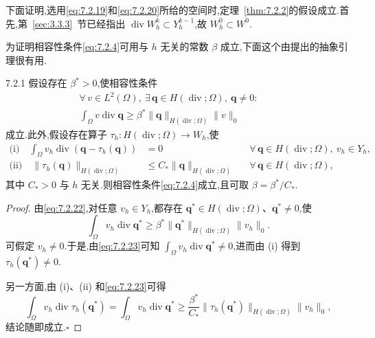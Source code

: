 下面证明,选用\eqref{eq:7.2.19}和\eqref{eq:7.2.20}所给的空间时,定理~\ref{thm:7.2.2}的假设成立.首先,第~\ref{sec:3.3.3}~节已经指出 \(\operatorname{div}W_h^k\subset Y_h^{k-1}\),故 \(W_h^0\subset W^0\).

为证明相容性条件\eqref{eq:7.2.4}可用与 \(h\) 无关的常数 \(\beta\) 成立,下面这个由提出的抽象引理很有用.

\begin{lemma}[Fortin]{7.2.1}
假设存在 \(\beta^*>0\),使相容性条件
\begin{equation}\label{eq:7.2.22}
  \begin{gathered}
    \forall\,v\in L^2(\Omega),\ \exists\,\boldsymbol{q}\in H(\operatorname{div};\Omega),\
      \boldsymbol{q}\ne0:\qquad\\
    \int_\Omega v\operatorname{div}\boldsymbol{q}
      \ge\beta^*\|\boldsymbol{q}\|_{H(\operatorname{div};\Omega)}\|v\|_0
  \end{gathered}
\end{equation}
成立.此外,假设存在算子 \(\tau_h\colon H(\operatorname{div};\Omega)\to W_h\),使
\[
  \begin{aligned}
    \text{(i)}\quad\int_\Omega v_h\operatorname{div}(\boldsymbol{q}-\tau_h(\boldsymbol{q}))
       &=0 &&\forall\,\boldsymbol{q}\in H(\operatorname{div};\Omega),\ v_h\in Y_h,\\
    \text{(ii)}\quad\|\tau_h(\boldsymbol{q})\|_{H(\operatorname{div};\Omega)}
       &\le C_*\|\boldsymbol{q}\|_{H(\operatorname{div};\Omega)}
       &&\forall\,\boldsymbol{q}\in H(\operatorname{div};\Omega),
  \end{aligned}
\]
其中 \(C_*>0\) 与 \(h\) 无关.则相容性条件\eqref{eq:7.2.4}成立,且可取 \(\beta=\beta^*/C_*\).
\end{lemma}

\begin{proof}
由\eqref{eq:7.2.22},对任意 \(v_h\in Y_h\),都存在 \(\boldsymbol{q}^*\in H(\operatorname{div};\Omega)\)、\(\boldsymbol{q}^*\ne0\),使
\begin{equation}\label{eq:7.2.23}
  \int_\Omega v_h\operatorname{div}\boldsymbol{q}^*
     \ge\beta^*\|\boldsymbol{q}^*\|_{H(\operatorname{div};\Omega)}\|v_h\|_0.
\end{equation}
可假定 \(v_h\ne0\).于是,由\eqref{eq:7.2.23}可知 \(\int_\Omega v_h\operatorname{div}\boldsymbol{q}^*\ne0\),进而由 (i) 得到 \(\tau_h(\boldsymbol{q}^*)\ne0\).

另一方面,由 (i)、(ii) 和\eqref{eq:7.2.23}可得
\[
  \int_\Omega v_h\operatorname{div}\tau_h(\boldsymbol{q}^*)
    =\int_\Omega v_h\operatorname{div}\boldsymbol{q}^*
    \ge\frac{\beta^*}{C_*}\|\tau_h(\boldsymbol{q}^*)\|_{H(\operatorname{div};\Omega)}\|v_h\|_0,
\]
结论随即成立.\hfill\(\square\)
\end{proof}

